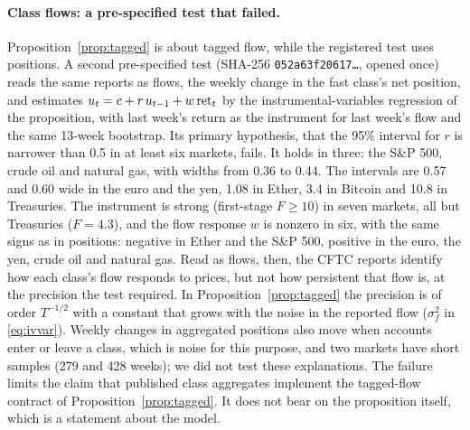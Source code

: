 \documentclass[12pt]{article}
\theoremstyle{definition}
\theoremstyle{remark}
\begin{document}
\paragraph{Class flows: a pre-specified test that failed.} Proposition~\ref{prop:tagged} is about tagged flow, while the registered test uses positions. A second pre-specified test (SHA-256 \texttt{052a63f20617\ldots}, opened once) reads the same reports as flows, the weekly change in the fast class's net position, and estimates $u_t=c+r\,u_{t-1}+w\,{\rm ret}_t$ by the instrumental-variables regression of the proposition, with last week's return as the instrument for last week's flow and the same 13-week bootstrap. Its primary hypothesis, that the 95\% interval for $r$ is narrower than 0.5 in at least six markets, fails. It holds in three: the S\&P 500, crude oil and natural gas, with widths from 0.36 to 0.44. The intervals are 0.57 and 0.60 wide in the euro and the yen, 1.08 in Ether, 3.4 in Bitcoin and 10.8 in Treasuries. The instrument is strong (first-stage $F\ge10$) in seven markets, all but Treasuries ($F=4.3$), and the flow response $w$ is nonzero in six, with the same signs as in positions: negative in Ether and the S\&P 500, positive in the euro, the yen, crude oil and natural gas. Read as flows, then, the CFTC reports identify how each class's flow responds to prices, but not how persistent that flow is, at the precision the test required. In Proposition~\ref{prop:tagged} the precision is of order $T^{-1/2}$ with a constant that grows with the noise in the reported flow ($\sigma_f^2$ in \eqref{eq:ivvar}). Weekly changes in aggregated positions also move when accounts enter or leave a class, which is noise for this purpose, and two markets have short samples (279 and 428 weeks); we did not test these explanations. The failure limits the claim that published class aggregates implement the tagged-flow contract of Proposition~\ref{prop:tagged}. It does not bear on the proposition itself, which is a statement about the model.
\end{document}
